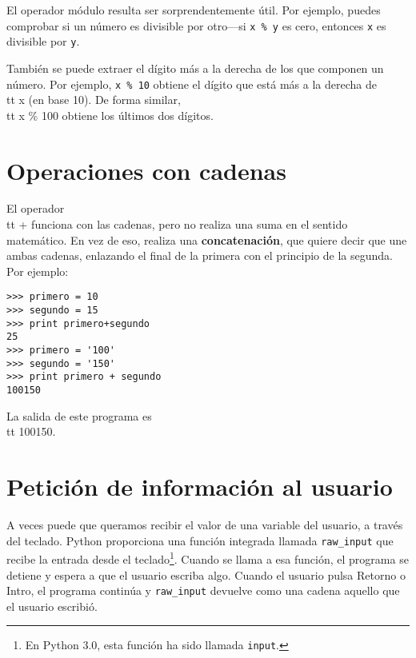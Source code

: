 El operador módulo resulta ser sorprendentemente útil. Por ejemplo,
puedes comprobar si un número es divisible por otro---si
{\tt x \% y} es cero, entonces {\tt x} es divisible por {\tt y}.


También se puede extraer el dígito más a la derecha
de los que componen un número. Por ejemplo, {\tt x \% 10} obtiene el
dígito que está más a la derecha de {\\tt x} (en base 10). De forma similar, {\\tt x \% 100}
obtiene los últimos dos dígitos.

\section{Operaciones con cadenas}

El operador {\\tt +} funciona con las cadenas, pero
no realiza una suma en el sentido matemático. En vez de eso, realiza una
{\bf concatenación}, que quiere decir que une ambas cadenas,
enlazando el final de la primera con el principio de la segunda. Por ejemplo:


\beforeverb
\begin{verbatim}
>>> primero = 10
>>> segundo = 15
>>> print primero+segundo
25
>>> primero = '100'
>>> segundo = '150'
>>> print primero + segundo
100150
\end{verbatim}
\afterverb
%
La salida de este programa es {\\tt 100150}.

\section{Petición de información al usuario}

A veces puede que queramos recibir el valor de una variable del usuario,
a través del teclado.
Python proporciona una función integrada llamada \verb"raw_input" que recibe
la entrada desde el teclado\footnote{En Python 3.0, esta función ha sido llamada
{\tt input}.}. Cuando se llama a esa función, el programa se detiene y
espera a que el usuario escriba algo. Cuando el usuario pulsa {\sf Retorno} o
{\sf Intro}, el programa continúa y \verb"raw_input"
devuelve como una cadena aquello que el usuario escribió.


